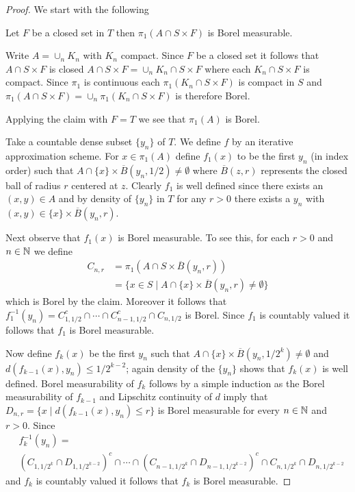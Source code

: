 \begin{proof}
We start with the following
\begin{clm}Let $F$ be a closed set in $T$ then $\pi_1(A \cap S\times F)$ is Borel measurable.
\end{clm}
Write $A = \cup_n K_n$ with $K_n$ compact.  Since $F$ be a closed set it follows that $A \cap S\times F$ is closed $A \cap S\times F =  \cup_n K_n \cap S \times F$ where each $K_n \cap S \times F$ is compact.  Since $\pi_1$ is continuous each $\pi_1 (K_n \cap S \times F)$ is compact in $S$ and $\pi_1 (A \cap S\times F) = \cup_n \pi_1(K_n \cap S \times F)$ is therefore Borel.  

Applying the claim with $F = T$ we see that $\pi_1(A)$ is Borel.

Take a countable dense subset $\lbrace y_n \rbrace$ of $T$.  We define $f$ by an iterative approximation scheme.  
For $x \in \pi_1(A)$ define $f_1(x)$ to be the first $y_n$ (in index order) such that $A \cap \lbrace x \rbrace \times \overline{B}(y_n, 1/2) \neq \emptyset$ where $\overline{B}(z,r)$ represents the closed ball of radius $r$ centered at $z$.  Clearly $f_1$ is well defined since there exists an $(x,y) \in A$ and by density of $\lbrace y_n \rbrace$ in $T$ for any $r > 0$ there exists a $y_n$ with $(x,y) \in \lbrace x \rbrace \times \overline{B}(y_n,r)$.

Next observe that $f_1(x)$ is Borel measurable.  To see this, for each $r > 0$ and $n \in \mathbb{N}$ we define 
\begin{align*}
C_{n,r} &= \pi_1(A \cap S \times \overline{B}(y_n,r) )\\
&= \lbrace x \in S \mid A \cap \lbrace x \rbrace \times \overline{B}(y_n,r) \neq \emptyset \rbrace
\end{align*}
which is Borel by the claim.  Moreover it follows that $f_1^{-1}(y_n) = C_{1, 1/2}^c \cap \dotsb \cap C_{n-1, 1/2}^c \cap C_{{n}, 1/2}$ is Borel.  Since $f_1$ is countably valued it follows that $f_1$ is Borel measurable.

Now define $f_k(x)$ be the first $y_n$ such that $A \cap \lbrace x \rbrace \times \overline{B}(y_n, 1/2^k) \neq \emptyset$ and $d(f_{k-1}(x), y_n) \leq 1/2^{k-2}$; again density of the $\lbrace y_n \rbrace$ shows that $f_k(x)$ is well defined.  Borel measurability of $f_k$ follows by a simple induction as the Borel measurability of $f_{k-1}$ and Lipschitz continuity of $d$ imply that $D_{n,r} = \lbrace x \mid d(f_{k-1}(x), y_n) \leq r \rbrace$ is Borel measurable for every $n \in \mathbb{N}$ and $r > 0$.  Since 
\begin{align*}
&f_k^{-1}(y_n) = \\
&(C_{1,1/2^k} \cap D_{1, 1/2^{k-2}})^c \cap \dotsb \cap (C_{n-1,1/2^k} \cap D_{n-1, 1/2^{k-2}})^c \cap  C_{n,1/2^k} \cap D_{n, 1/2^{k-2}}
\end{align*}
and $f_k$ is countably valued it follows that $f_k$ is Borel measurable.


\end{proof}

